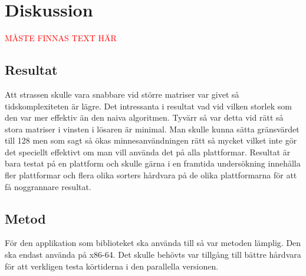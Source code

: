 \section{Diskussion}
\textcolor{red}{MÅSTE FINNAS TEXT HÄR}
\subsection{Resultat}
Att strassen skulle vara snabbare vid större matriser var givet så tidskomplexiteten är lägre. Det intressanta i resultat vad vid vilken storlek som den var mer effektiv än den naiva algoritmen. Tyvärr så var detta vid rätt så stora matriser i vinsten i lösaren är minimal. Man skulle kunna sätta gränsvärdet till 128 men som sagt så ökas minnesanvändningen rätt så mycket vilket inte gör det speciellt effektivt om man vill använda det på alla plattformar. Resultat är bara testat på en plattform och skulle gärna i en framtida undersökning innehålla fler plattformar och flera olika sorters hårdvara på de olika plattformarna för att få noggrannare resultat.
\subsection{Metod}
För den applikation som biblioteket ska använda till så var metoden lämplig. Den ska endast använda på x86-64.
Det skulle behövts var tillgång till bättre hårdvara för att verkligen testa körtiderna i den parallella versionen.